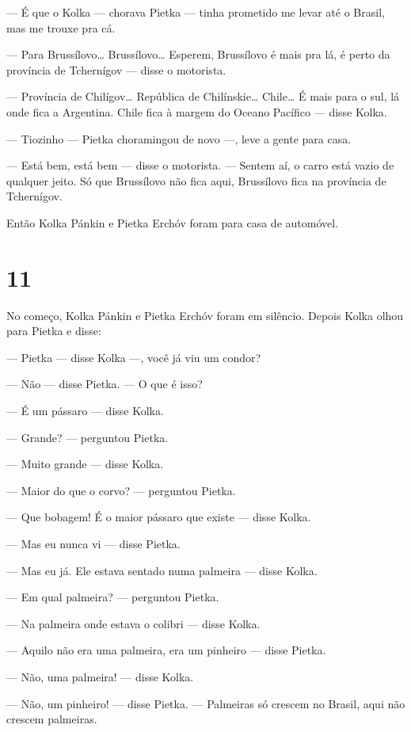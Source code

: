--- É que o Kolka --- chorava Pietka --- tinha prometido me levar até o
Brasil, mas me trouxe pra cá.

--- Para Brussílovo\ldots{} Brussílovo\ldots{} Esperem, Brussílovo é mais pra lá,
é perto da província de Tchernígov --- disse o motorista.

--- Província de Chilígov\ldots{} República de Chilínskie\ldots{} Chile\ldots{} É mais
para o sul, lá onde fica a Argentina. Chile fica à margem do Oceano
Pacífico --- disse Kolka.

--- Tiozinho --- Pietka choramingou de novo ---, leve a gente para casa.

--- Está bem, está bem --- disse o motorista. --- Sentem aí, o carro
está vazio de qualquer jeito. Só que Brussílovo não fica aqui,
Brussílovo fica na província de Tchernígov.

Então Kolka Pánkin e Pietka Erchóv foram para casa de automóvel.

\section{11}

No começo, Kolka Pánkin e Pietka Erchóv foram em silêncio. Depois Kolka
olhou para Pietka e disse:

--- Pietka --- disse Kolka ---, você já viu um condor?

--- Não --- disse Pietka. --- O que é isso?

--- É um pássaro --- disse Kolka.

--- Grande? --- perguntou Pietka.

--- Muito grande --- disse Kolka.

--- Maior do que o corvo? --- perguntou Pietka.

--- Que bobagem! É o maior pássaro que existe --- disse Kolka.

--- Mas eu nunca vi --- disse Pietka.

--- Mas eu já. Ele estava sentado numa palmeira --- disse Kolka.

--- Em qual palmeira? --- perguntou Pietka.

--- Na palmeira onde estava o colibri --- disse Kolka.

--- Aquilo não era uma palmeira, era um pinheiro --- disse Pietka.

--- Não, uma palmeira! --- disse Kolka.

--- Não, um pinheiro! --- disse Pietka. --- Palmeiras só crescem no
Brasil, aqui não crescem palmeiras.

